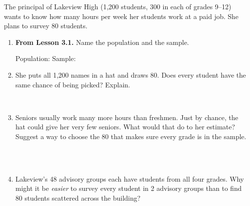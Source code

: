 \documentclass[12pt]{article}
\begin{document}

\vspace{0.22in}

The principal of Lakeview High (1{,}200 students, 300 in each of grades 9--12) wants to know how
many hours per week her students work at a paid job. She plans to survey 80 students.

\vspace{0.16in}

\begin{enumerate}[leftmargin=1.9em, itemsep=0.34in]

  \item \textbf{From Lesson 3.1.} Name the population and the sample.

        \vspace{12pt}
        Population:  \qquad Sample: 

  \item She puts all 1{,}200 names in a hat and draws 80. Does every student have the same
        chance of being picked? Explain.

        \vspace{12pt}
        \\[18pt]

  \item Seniors usually work many more hours than freshmen. Just by chance, the hat could give
        her very few seniors. What would that do to her estimate? Suggest a way to choose the 80
        that makes sure every grade is in the sample.

        \vspace{12pt}
        \\[18pt]\\[18pt]

  \item Lakeview's 48 advisory groups each have students from all four grades. Why might it be
        \emph{easier} to survey every student in 2 advisory groups than to find 80 students
        scattered across the building?

        \vspace{12pt}
        \\[18pt]

\end{enumerate}
\end{document}

